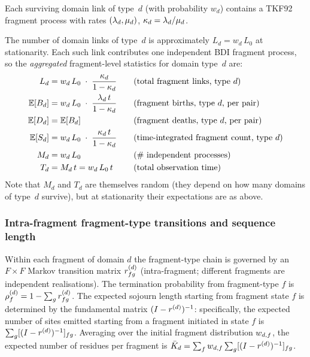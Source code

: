 Each surviving domain link of type~$d$ (with probability $w_d$) contains
a TKF92 fragment process with rates $(\lambda_d, \mu_d)$,
$\kappa_d = \lambda_d/\mu_d$.

The number of domain links of type~$d$ is approximately
$L_d = w_d\,L_0$ at stationarity.
Each such link contributes one independent BDI fragment process,
so the \emph{aggregated} fragment-level statistics for domain type~$d$
are:
\begin{alignat}{2}
L_d &= w_d\,L_0\;\cdot\;\frac{\kappa_d}{1-\kappa_d}
  &\quad& \text{(total fragment links, type $d$)}
\label{eq:Ld}
\\
\mathbb{E}[B_d] &= w_d\,L_0\;\cdot\;
  \frac{\lambda_d\,t}{1-\kappa_d}
  &\quad& \text{(fragment births, type $d$, per pair)}
\label{eq:EBd}
\\
\mathbb{E}[D_d] &= \mathbb{E}[B_d]
  &\quad& \text{(fragment deaths, type $d$, per pair)}
\label{eq:EDd}
\\
\mathbb{E}[S_d] &= w_d\,L_0\;\cdot\;
  \frac{\kappa_d\,t}{1-\kappa_d}
  &\quad& \text{(time-integrated fragment count, type $d$)}
\label{eq:ESd}
\\
M_d &= w_d\,L_0
  &\quad& \text{(\# independent processes)}
\label{eq:Md}
\\
T_d &= M_d\,t = w_d\,L_0\,t
  &\quad& \text{(total observation time)}
\label{eq:Td}
\end{alignat}
Note that $M_d$ and $T_d$ are themselves random (they depend on how
many domains of type~$d$ survive), but at stationarity their
expectations are as above.

\subsubsection{Intra-fragment fragment-type transitions and sequence length}

Within each fragment of domain $d$ the fragment-type chain
is governed by an $F \times F$ Markov transition matrix $r^{(d)}_{fg}$
(intra-fragment; different fragments are independent realisations).
The termination probability from fragment-type $f$ is
$\rho^{(d)}_f = 1 - \sum_g r^{(d)}_{fg}$.
The expected sojourn length starting from fragment state $f$ is determined
by the fundamental matrix $(I - r^{(d)})^{-1}$: specifically, the expected
number of sites emitted starting from a fragment initiated in state $f$ is
$\sum_g [(I - r^{(d)})^{-1}]_{fg}$.
Averaging over the initial fragment distribution $w_{d,f}$, the
expected number of residues per fragment is
$\bar{K}_d = \sum_f w_{d,f} \sum_g [(I - r^{(d)})^{-1}]_{fg}$.

